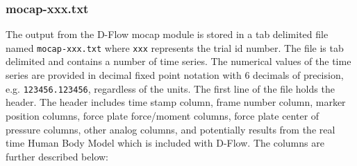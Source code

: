 \documentclass[fleqn,12pt]{wlpeerj}
\begin{document}
\subsubsection*{mocap-xxx.txt}

The output from the D-Flow mocap module is stored in a tab delimited file named
\verb+mocap-xxx.txt+ where \verb+xxx+ represents the trial id number. The file
is tab delimited and contains a number of time series. The numerical values of
the time series are provided in decimal fixed point notation with 6 decimals of
precision, e.g. \verb|123456.123456|, regardless of the units. The first line
of the file holds the header. The header includes time stamp column, frame
number column, marker position columns, force plate force/moment columns, force
plate center of pressure columns, other analog columns, and potentially results
from the real time Human Body Model \cite{Bogert2013} which is included with
D-Flow. The columns are further described below:
%
\end{document}
